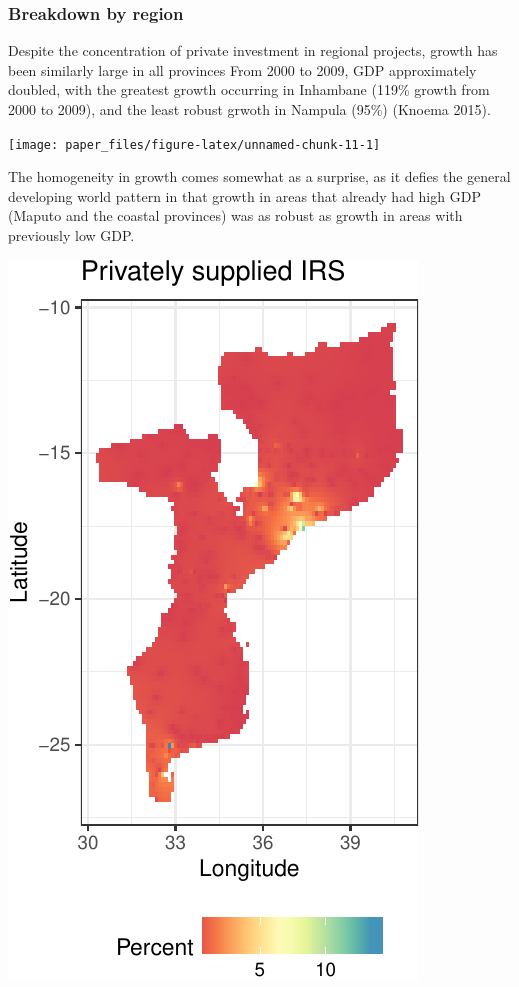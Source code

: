\documentclass[]{elsarticle} %
\begin{document}
\subsubsection{Breakdown by region}\label{breakdown-by-region}

Despite the concentration of private investment in regional projects,
growth has been similarly large in all provinces From 2000 to 2009, GDP
approximately doubled, with the greatest growth occurring in Inhambane
(119\% growth from 2000 to 2009), and the least robust grwoth in Nampula
(95\%) (Knoema 2015).

\begin{center}\texttt{[image: paper\_files/figure-latex/unnamed-chunk-11-1]} \end{center}

The homogeneity in growth comes somewhat as a surprise, as it defies the
general developing world pattern in that growth in areas that already
had high GDP (Maputo and the coastal provinces) was as robust as growth
in areas with previously low GDP.

\begin{center}\includegraphics{paper_files/figure-latex/unnamed-chunk-12-1} \end{center}
\end{document}
